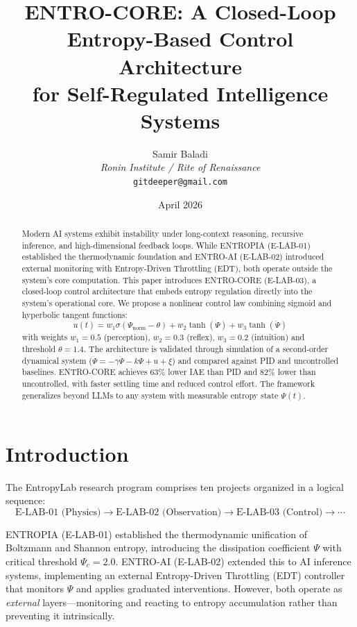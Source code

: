 \documentclass[twocolumn]{article}
\title{ENTRO-CORE: A Closed-Loop Entropy-Based Control Architecture\\ for Self-Regulated Intelligence Systems}
\author{Samir Baladi\\
  \textit{Ronin Institute / Rite of Renaissance}\\
  \texttt{gitdeeper@gmail.com}
}
\date{April 2026}
\begin{document}
\maketitle

\begin{abstract}
Modern AI systems exhibit instability under long-context reasoning, recursive inference, and high-dimensional feedback loops. While ENTROPIA (E-LAB-01) established the thermodynamic foundation and ENTRO-AI (E-LAB-02) introduced external monitoring with Entropy-Driven Throttling (EDT), both operate outside the system's core computation. This paper introduces ENTRO-CORE (E-LAB-03), a closed-loop control architecture that embeds entropy regulation directly into the system's operational core. We propose a nonlinear control law combining sigmoid and hyperbolic tangent functions:
\[
u(t) = w_1 \sigma(\Psi_{\text{norm}} - \theta) + w_2 \tanh(\dot\Psi) + w_3 \tanh(\ddot\Psi)
\]
with weights \(w_1=0.5\) (perception), \(w_2=0.3\) (reflex), \(w_3=0.2\) (intuition) and threshold \(\theta=1.4\). The architecture is validated through simulation of a second-order dynamical system (\(\ddot\Psi = -\gamma\dot\Psi - k\Psi + u + \xi\)) and compared against PID and uncontrolled baselines. ENTRO-CORE achieves 63\% lower IAE than PID and 82\% lower than uncontrolled, with faster settling time and reduced control effort. The framework generalizes beyond LLMs to any system with measurable entropy state \(\Psi(t)\).
\end{abstract}

\section{Introduction}

The EntropyLab research program comprises ten projects organized in a logical sequence:
\[
\text{E-LAB-01 (Physics)} \rightarrow \text{E-LAB-02 (Observation)} \rightarrow \text{E-LAB-03 (Control)} \rightarrow \cdots
\]

ENTROPIA (E-LAB-01) established the thermodynamic unification of Boltzmann and Shannon entropy, introducing the dissipation coefficient \(\Psi\) with critical threshold \(\Psi_c = 2.0\). ENTRO-AI (E-LAB-02) extended this to AI inference systems, implementing an external Entropy-Driven Throttling (EDT) controller that monitors \(\Psi\) and applies graduated interventions. However, both operate as \textit{external} layers—monitoring and reacting to entropy accumulation rather than preventing it intrinsically.
\end{document}
